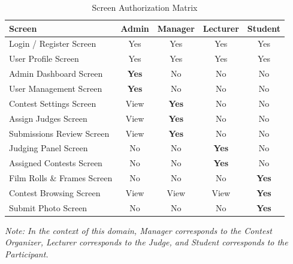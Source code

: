 \documentclass[12pt,a4paper]{article}
\begin{document}
\begin{table}[h!]
\centering
\caption{Screen Authorization Matrix}
\label{tab:screen_auth}
\begin{tabularx}{\textwidth}{X c c c c}
\toprule
\textbf{Screen} & \textbf{Admin} & \textbf{Manager} & \textbf{Lecturer} & \textbf{Student} \\
\midrule
Login / Register Screen & Yes & Yes & Yes & Yes \\
User Profile Screen & Yes & Yes & Yes & Yes \\
Admin Dashboard Screen & \textbf{Yes} & No & No & No \\
User Management Screen & \textbf{Yes} & No & No & No \\
Contest Settings Screen & View & \textbf{Yes} & No & No \\
Assign Judges Screen & View & \textbf{Yes} & No & No \\
Submissions Review Screen & View & \textbf{Yes} & No & No \\
Judging Panel Screen & No & No & \textbf{Yes} & No \\
Assigned Contests Screen & No & No & \textbf{Yes} & No \\
Film Rolls \& Frames Screen & No & No & No & \textbf{Yes} \\
Contest Browsing Screen & View & View & View & \textbf{Yes} \\
Submit Photo Screen & No & No & No & \textbf{Yes} \\
\bottomrule
\end{tabularx}
\end{table}

\textit{Note: In the context of this domain, Manager corresponds to the Contest Organizer, Lecturer corresponds to the Judge, and Student corresponds to the Participant.}
\end{document}

